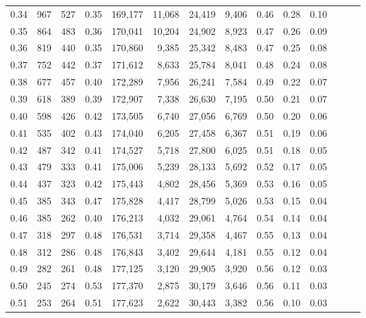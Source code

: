 \begin{tabular}{rrrrrrrrrrrrrr}
0.34 &     967 &    527 &  0.35 &  169,177 &   11,068 &  24,419 &   9,406 &  0.46 &  0.28 &      0.10 \\
0.35 &     864 &    483 &  0.36 &  170,041 &   10,204 &  24,902 &   8,923 &  0.47 &  0.26 &      0.09 \\
0.36 &     819 &    440 &  0.35 &  170,860 &    9,385 &  25,342 &   8,483 &  0.47 &  0.25 &      0.08 \\
0.37 &     752 &    442 &  0.37 &  171,612 &    8,633 &  25,784 &   8,041 &  0.48 &  0.24 &      0.08 \\
0.38 &     677 &    457 &  0.40 &  172,289 &    7,956 &  26,241 &   7,584 &  0.49 &  0.22 &      0.07 \\
0.39 &     618 &    389 &  0.39 &  172,907 &    7,338 &  26,630 &   7,195 &  0.50 &  0.21 &      0.07 \\
0.40 &     598 &    426 &  0.42 &  173,505 &    6,740 &  27,056 &   6,769 &  0.50 &  0.20 &      0.06 \\
0.41 &     535 &    402 &  0.43 &  174,040 &    6,205 &  27,458 &   6,367 &  0.51 &  0.19 &      0.06 \\
0.42 &     487 &    342 &  0.41 &  174,527 &    5,718 &  27,800 &   6,025 &  0.51 &  0.18 &      0.05 \\
0.43 &     479 &    333 &  0.41 &  175,006 &    5,239 &  28,133 &   5,692 &  0.52 &  0.17 &      0.05 \\
0.44 &     437 &    323 &  0.42 &  175,443 &    4,802 &  28,456 &   5,369 &  0.53 &  0.16 &      0.05 \\
0.45 &     385 &    343 &  0.47 &  175,828 &    4,417 &  28,799 &   5,026 &  0.53 &  0.15 &      0.04 \\
0.46 &     385 &    262 &  0.40 &  176,213 &    4,032 &  29,061 &   4,764 &  0.54 &  0.14 &      0.04 \\
0.47 &     318 &    297 &  0.48 &  176,531 &    3,714 &  29,358 &   4,467 &  0.55 &  0.13 &      0.04 \\
0.48 &     312 &    286 &  0.48 &  176,843 &    3,402 &  29,644 &   4,181 &  0.55 &  0.12 &      0.04 \\
0.49 &     282 &    261 &  0.48 &  177,125 &    3,120 &  29,905 &   3,920 &  0.56 &  0.12 &      0.03 \\
0.50 &     245 &    274 &  0.53 &  177,370 &    2,875 &  30,179 &   3,646 &  0.56 &  0.11 &      0.03 \\
0.51 &     253 &    264 &  0.51 &  177,623 &    2,622 &  30,443 &   3,382 &  0.56 &  0.10 &      0.03 \\

\end{tabular}
